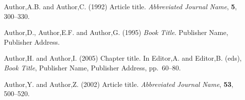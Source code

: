 \documentclass[a4,center,fleqn]{NAR}
\begin{document}
\begin{thebibliography}{4}

Author,A.B. and Author,C. (1992)
Article title.
\textit{Abbreviated Journal Name}, \textbf{5}, 300--330.

Author,D., Author,E.F. and Author,G. (1995)
\textit{Book Title}.
Publisher Name, Publisher Address.

Author,H. and Author,I. (2005)
Chapter title.
In
Editor,A. and Editor,B. (eds),
\textit{Book Title},
Publisher Name, Publisher Address,
pp.\ 60--80.

Author,Y. and Author,Z. (2002)
Article title.
\textit{Abbreviated Journal Name}, \textbf{53}, 500--520.













\end{thebibliography}
\end{document}

